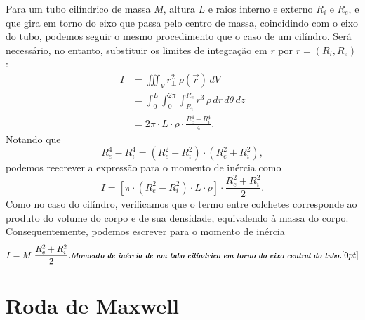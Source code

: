 Para um tubo cilíndrico de massa $M$, altura $L$ e raios interno e externo $R_i$ e $R_e$, e que gira em torno do eixo que passa pelo centro de massa, coincidindo com o eixo do tubo, podemos seguir o mesmo procedimento que o caso de um cilíndro. Será necessário, no entanto, substituir os limites de integração em $r$ por $r = (R_i, R_e)$:
\begin{align}
    I &= \iiint_V r_\perp^2 \, \rho(\vec{r}) \, dV \\
    &= \int_0^L \int_0^{2\pi} \int_{R_i}^{R_e} r^3 \, \rho \, dr \, d\theta \, dz \\
    &= 2\pi \cdot L \cdot \rho \cdot \frac{R_e^4 - R_i^4}{4}.
\end{align}
%
Notando que 
\begin{equation}
    R_e^4 - R_i^4 = (R_e^2 - R_i^2)\cdot(R_e^2 + R_i^2),
\end{equation}
%
podemos reecrever a expressão para o momento de inércia como
\begin{equation}
    I = [\pi \cdot (R_e^2 - R_i^2) \cdot L \cdot \rho] \cdot \frac{R_e^2 + R_i^2}{2}.
\end{equation}
%
Como no caso do cilíndro, verificamos que o termo entre colchetes corresponde ao produto do volume do corpo e de sua densidade, equivalendo à massa do corpo. Consequentemente, podemos escrever para o momento de inércia
\begin{equation}\label{Eq:MomentoDeInerciaTuboCilindrico}
    I = M \; \frac{R_e^2 + R_i^2}{2}. \relax{\footnotesize\emph{\textbf{Momento de inércia de um tubo cilíndrico em torno do eixo central do tubo.}}}[0pt]
\end{equation}

\section{Roda de Maxwell}

